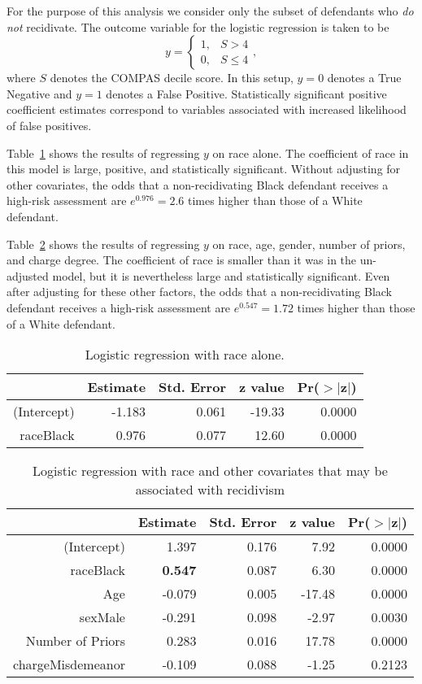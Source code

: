 \documentclass[11pt, svgnames]{article}
\numberwithin{equation}{section}
\theoremstyle{plain}
\theoremstyle{definition}
\numberwithin{prop}{section}
\numberwithin{corollary}{section}
\begin{document}
For the purpose of this analysis we consider only the subset of defendants who \emph{do not} recidivate.  The outcome variable for the logistic regression is taken to be 
\[
y = \begin{cases}
1, & S > 4 \\
0, & S \le 4
\end{cases},
\]
where $S$ denotes the COMPAS decile score.  In this setup, $y = 0$ denotes a True Negative and $y = 1$ denotes a False Positive.  Statistically significant positive coefficient estimates correspond to variables associated with increased likelihood of false positives.

Table~\ref{tab:race_alone} shows the results of regressing $y$ on race alone.  The coefficient of race in this model is large, positive, and statistically significant.  Without adjusting for other covariates, the odds that a non-recidivating Black defendant receives a high-risk assessment are $e^{0.976}= 2.6$ times higher than those of a White defendant.

Table~\ref{tab:race_adjusted} shows the results of regressing $y$ on race, age, gender, number of priors, and charge degree.  The coefficient of race is smaller than it was in the un-adjusted model, but it is nevertheless large and statistically significant.  Even after adjusting for these other factors, the odds that a non-recidivating Black defendant receives a high-risk assessment are $e^{0.547} = 1.72$ times higher than those of a White defendant.  

  
  \begin{table}[ht]
  \centering
    \begin{tabular}{rrrrr}
      \hline
     & Estimate & Std. Error & z value & Pr($>$$|$z$|$) \\ 
      \hline
    (Intercept) & -1.183 & 0.061 & -19.33 & 0.0000 \\ 
      raceBlack & 0.976 & 0.077 & 12.60 & 0.0000 \\ 
       \hline
    \end{tabular}
    \caption{Logistic regression with race alone.}
    \label{tab:race_alone}
  \end{table}
  
  
  \begin{table}[ht]
    \centering
  \begin{tabular}{rrrrr}
    \hline
   & Estimate & Std. Error & z value & Pr($>$$|$z$|$) \\ 
    \hline
  (Intercept) & 1.397 & 0.176 & 7.92 & 0.0000 \\ 
    raceBlack & \textbf{0.547} & 0.087 & 6.30 & 0.0000 \\ 
    Age & -0.079 & 0.005 & -17.48 & 0.0000 \\ 
    sexMale & -0.291 & 0.098 & -2.97 & 0.0030 \\ 
    Number of Priors & 0.283 & 0.016 & 17.78 & 0.0000 \\ 
    chargeMisdemeanor & -0.109 & 0.088 & -1.25 & 0.2123 \\  
     \hline
  \end{tabular}
  \caption{Logistic regression with race and other covariates that may be associated with recidivism}
  \label{tab:race_adjusted}
  \end{table}
  
\newpage 
% 
% 


\end{document}
